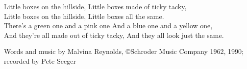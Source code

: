 
\epigraph{%
Little boxes on the hillside,
Little boxes made of ticky tacky, \\
Little boxes on the hillside,
Little boxes all the same. \\
There's a green one and a pink one
And a blue one and a yellow one, \\
And they're all made out of ticky tacky,
And they all look just the same.
}
{Words and music by Malvina Reynolds, \copyright Schroder Music Company 1962, 1990; recorded by Pete Seeger}
